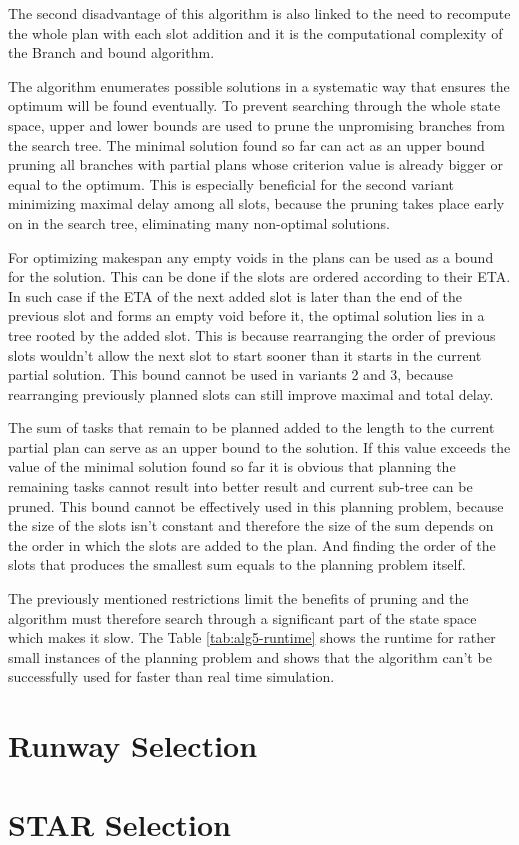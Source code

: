 The second disadvantage of this algorithm is also linked to the need to recompute the whole plan with each slot addition and it is the computational complexity of the Branch and bound algorithm.

The algorithm enumerates possible solutions in a systematic way that ensures the optimum will be found eventually. To prevent searching through the whole state space, upper and lower bounds are used to prune the unpromising branches from the search tree. The minimal solution found so far can act as an upper bound pruning all branches with partial plans whose criterion value is already bigger or equal to the optimum. This is especially beneficial for the second variant minimizing maximal delay among all slots, because the pruning takes place early on in the search tree, eliminating many non-optimal solutions.

For optimizing makespan any empty voids in the plans can be used as a bound for the solution. This can be done if the slots are ordered according to their ETA. In such case if the ETA of the next added slot is later than the end of the previous slot and forms an empty void before it, the optimal solution lies in a tree rooted by the added slot. This is because rearranging the order of previous slots wouldn't allow the next slot to start sooner than it starts in the current partial solution. This bound cannot be used in variants 2 and 3, because rearranging previously planned slots can still improve maximal and total delay.

The sum of tasks that remain to be planned added to the length to the current partial plan can serve as an upper bound to the solution. If this value exceeds the value of the minimal solution found so far it is obvious that planning the remaining tasks cannot result into better result and current sub-tree can be pruned. This bound cannot be effectively used in this planning problem, because the size of the slots isn't constant and therefore the size of the sum depends on the order in which the slots are added to the plan. And finding the order of the slots that produces the smallest sum equals to the planning problem itself.

The previously mentioned restrictions limit the benefits of pruning and the algorithm must therefore search through a significant part of the state space which makes it slow. The Table \ref{tab:alg5-runtime} shows the runtime for rather small instances of the planning problem and shows that the algorithm can't be successfully used for faster than real time simulation.

\section{Runway Selection}

\section{STAR Selection}
